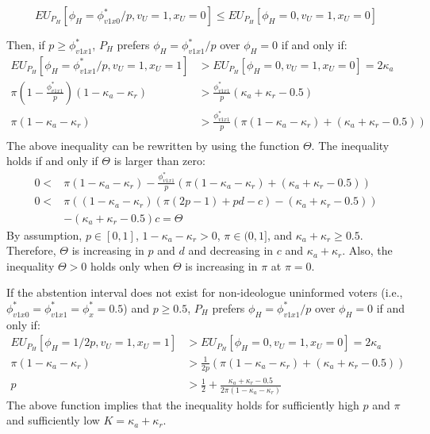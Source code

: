 $$EU_{P_H}[\phi_H = \phi^*_{v1x0}/p, v_U = 1, x_U = 0] \leq EU_{P_H}[\phi_H=0, v_U=1, x_U=0]$$

\par Then, if $p \geq \phi^*_{v1x1}$, $P_H$ prefers $\phi_H = \phi^*_{v1x1}/p$ over $\phi_H = 0$ if and only if:
\begin{align*}
EU_{P_H}[\phi_H = \phi^*_{v1x1}/p, v_U = 1, x_U = 1] &> EU_{P_H}[\phi_H=0, v_U=1, x_U=0] = 2 \kappa_a \\ 
\pi \left(1-\frac{\phi^*_{v1x1}}{p}\right)(1-\kappa_a-\kappa_r) &> \frac{\phi^*_{v1x1}}{p} (\kappa_a + \kappa_r - 0.5) \\
\pi (1-\kappa_a-\kappa_r) &> \frac{\phi^*_{v1x1}}{p} (\pi(1-\kappa_a-\kappa_r) + (\kappa_a + \kappa_r - 0.5)) \\
\end{align*}
\noindent The above inequality can be rewritten by using the function $\Theta$. The inequality holds if and only if $\Theta$ is larger than zero:
\begin{align*}
0 <& \pi (1-\kappa_a-\kappa_r) - \frac{\phi^*_{v1x1}}{p} (\pi(1-\kappa_a-\kappa_r) + (\kappa_a + \kappa_r - 0.5)) \\
0 <& \pi( (1-\kappa_a-\kappa_r)(\pi (2p-1) + pd - c) - (\kappa_a+\kappa_r-0.5)) \\ 
&- (\kappa_a+\kappa_r-0.5)c = \Theta 
\end{align*}
\noindent By assumption, $p\in[0,1]$, $1-\kappa_a-\kappa_r > 0$, $\pi \in (0,1]$, and $\kappa_a+\kappa_r \geq 0.5$. Therefore, $\Theta$ is increasing in $p$ and $d$ and decreasing in $c$ and $\kappa_a+\kappa_r$. Also, the inequality $\Theta>0$ holds only when $\Theta$ is increasing in $\pi$ at $\pi=0$. 

\par If the abstention interval does not exist for non-ideologue uninformed voters (i.e., $\phi^*_{v1x0}=\phi^*_{v1x1}=\phi^*_x=0.5$) and $p \geq 0.5$, $P_H$ prefers $\phi_H = \phi^*_{v1x1}/p$ over $\phi_H = 0$ if and only if:
\begin{align*}
EU_{P_H}[\phi_H = 1/2p, v_U = 1, x_U = 1] &> EU_{P_H}[\phi_H=0, v_U=1, x_U=0] = 2 \kappa_a \\ 
\pi (1-\kappa_a-\kappa_r) &> \frac{1}{2p} (\pi(1-\kappa_a-\kappa_r) + (\kappa_a + \kappa_r - 0.5)) \\
p &> \frac{1}{2}+ \frac{\kappa_a + \kappa_r - 0.5}{2\pi(1-\kappa_a-\kappa_r)}
\end{align*}
\noindent The above function implies that the inequality holds for sufficiently high $p$ and $\pi$ and sufficiently low $K = \kappa_a + \kappa_r$.

